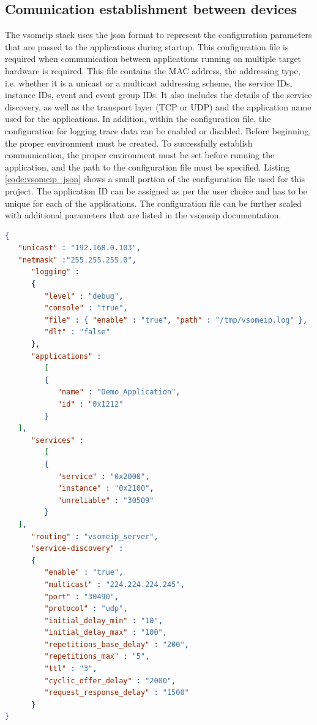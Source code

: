 \subsection{Comunication establishment between devices}
The vsomeip stack uses the json format to represent the configuration parameters that are passed to the applications during startup. This configuration file is required when communication between applications running on multiple target hardware is required. This file contains the MAC address, the addressing type, i.e. whether it is a unicast or a multicast addressing scheme, the service IDs, instance IDs, event and event group IDs. It also includes the details of the service discovery, as well as the transport layer (TCP or UDP) and the application name used for the applications. In addition, within the configuration file, the configuration for logging trace data can be enabled or disabled. Before beginning, the proper environment must be created. To successfully establish communication, the proper environment must be set before running the application, and the path to the configuration file must be specified. Listing \ref{code:vsomeip_json} shows a small portion of the configuration file used for this project. The application ID can be assigned as per the user choice and has to be unique for each of the applications. The configuration file can be further scaled with additional parameters that are listed in the vsomeip documentation\cite{b_vsomeip_userguide}. 

\begin{lstlisting}[language=json, caption={example of vsomeip configuration file - vsomeip.json}, label=code:vsomeip_json]
{
   "unicast" : "192.168.0.103",
   "netmask" :"255.255.255.0",
      "logging" :
      { 
         "level" : "debug",
         "console" : "true",
         "file" : { "enable" : "true", "path" : "/tmp/vsomeip.log" },
         "dlt" : "false"
      },
      "applications" : 
         [
         {
            "name" : "Demo_Application",
            "id" : "0x1212"
         }
   ],
      "services" :
         [
         {
            "service" : "0x2000",
            "instance" : "0x2100",
            "unreliable" : "30509"           
         }
   ],
      "routing" : "vsomeip_server",
      "service-discovery" :
      {
         "enable" : "true",
         "multicast" : "224.224.224.245",
         "port" : "30490",
         "protocol" : "udp",
         "initial_delay_min" : "10",
         "initial_delay_max" : "100",
         "repetitions_base_delay" : "200",
         "repetitions_max" : "5",
         "ttl" : "3",
         "cyclic_offer_delay" : "2000",
         "request_response_delay" : "1500"
      }
}
\end{lstlisting}